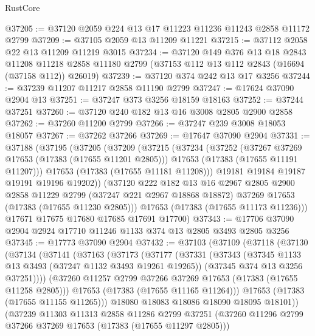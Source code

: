 \begin{lexlean}{RustCore}
\begin{coremodule}
@37205 := @37120 @2059 @224 @13 @17 @11223 @11236 @11243 @2858 @11172 @2799
@37209 := @37105 @2059 @13 @11209 @11221
@37215 := @37112 @2058 @22 @13 @11209 @11219 @3015
@37234 := @37120
    @149
    @376
    @13
    @18
    @2843
    @11208
    @11218
    @2858
    @11180
    @2799
    (@37153 @112 @13 @112 @2843 (@16694 (@37158 @112)) @26019)
@37239 := @37120 @374 @242 @13 @17 @3256
@37244 := @37239 @11207 @11217 @2858 @11190 @2799
@37247 := @17624 @37090 @2904 @13
@37251 := @37247 @373 @3256 @18159 @18163
@37252 := @37244 @37251
@37260 := @37120 @240 @182 @13 @16 @3008 @2805 @2900 @2858
@37262 := @37260 @11200 @2799
@37266 := @37247 @239 @3008 @18053 @18057
@37267 := @37262 @37266
@37269 := @17647 @37090 @2904
@37331 := @37188
    (@37195
      (@37205
        (@37209
          (@37215
            (@37234
              (@37252
                (@37267 @37269 @17653 (@17383 (@17655 @11201 @2805)))
                @17653
                (@17383 (@17655 @11191 @11207)))
              @17653
              (@17383 (@17655 @11181 @11208)))
            @19181
            @19184
            @19187
            @19191
            @19196
            @19202))
        (@37120
          @222
          @182
          @13
          @16
          @2967
          @2805
          @2900
          @2858
          @11229
          @2799
          (@37247 @221 @2967 @18868 @18872)
          @37269
          @17653
          (@17383 (@17655 @11230 @2805)))
        @17653
        (@17383 (@17655 @11173 @11236)))
      @17671
      @17675
      @17680
      @17685
      @17691
      @17700)
@37343 := @17706 @37090 @2904 @2924 @17710 @11246 @1133 @374 @13 @2805 @3493 @2805 @3256
@37345 := @17773 @37090 @2904
@37432 := @37103
    (@37109
      (@37118
        (@37130
          (@37134
            (@37141
              (@37163
                (@37173
                  (@37177
                    (@37331
                      (@37343
                        (@37345 @1133 @13 @3493 (@37247 @1132 @3493 @19261 @19265))
                        (@37345 @374 @13 @3256 @37251))))
                  (@37260 @11257 @2799 @37266 @37269 @17653 (@17383 (@17655 @11258 @2805)))
                  @17653
                  (@17383 (@17655 @11165 @11264)))
                @17653
                (@17383 (@17655 @11155 @11265)))
              @18080
              @18083
              @18086
              @18090
              @18095
              @18101))
          (@37239
            @11303
            @11313
            @2858
            @11286
            @2799
            @37251
            (@37260 @11296 @2799 @37266 @37269 @17653 (@17383 (@17655 @11297 @2805)))

\end{coremodule}
\end{lexlean}
